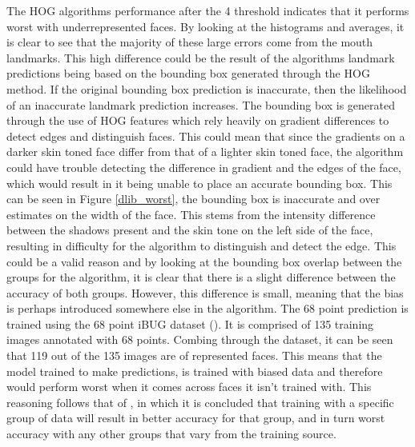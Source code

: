 \documentclass{l4proj}
\begin{document}
The HOG algorithms performance after the 4 threshold indicates that it performs worst with underrepresented faces. By looking at the histograms and averages, it is clear to see that the majority of these large errors come from the mouth landmarks. This high difference could be the result of the algorithms landmark predictions being based on the bounding box generated through the HOG method. If the original bounding box prediction is inaccurate, then the likelihood of an inaccurate landmark prediction increases. The bounding box is generated through the use of HOG features which rely heavily on gradient differences to detect edges and distinguish faces. This could mean that since the gradients on a darker skin toned face differ from that of a lighter skin toned face, the algorithm could have trouble detecting the difference in gradient and the edges of the face, which would result in it being unable to place an accurate bounding box. This can be seen in Figure \ref{dlib_worst}, the bounding box is inaccurate and over estimates on the width of the face. This stems from the intensity difference between the shadows present and the skin tone on the left side of the face, resulting in difficulty for the algorithm to distinguish and detect the edge. This could be a valid reason and by looking at the bounding box overlap between the groups for the algorithm, it is clear that there is a slight difference between the accuracy of both groups. However, this difference is small, meaning that the bias is perhaps introduced somewhere else in the algorithm. The 68 point prediction is trained using the 68 point iBUG dataset (\cite{300w}). It is comprised of 135 training images annotated with 68 points. Combing through the dataset, it can be seen that 119 out of the 135 images are of represented faces. This means that the model trained to make predictions, is trained with biased data and therefore would perform worst when it comes across faces it isn't trained with. This reasoning follows that of \cite{prideorpre}, in which it is concluded that training with a specific group of data will result in better accuracy for that group, and in turn worst accuracy with any other groups that vary from the training source.
\end{document}
